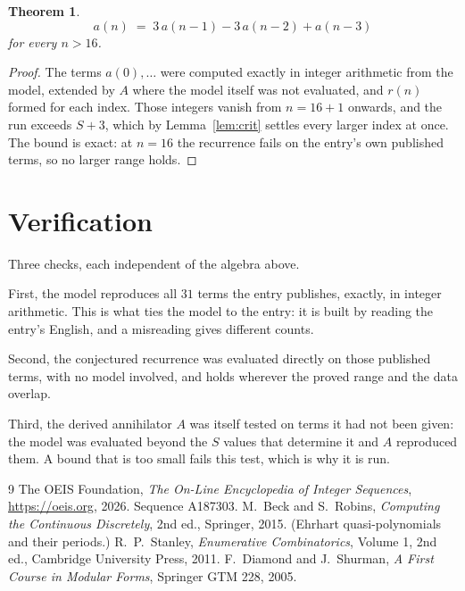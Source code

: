 \documentclass[11pt,a4paper]{article}
\theoremstyle{plain}
\newtheorem{theorem}{Theorem}
\theoremstyle{definition}
\begin{document}
\begin{theorem}
\[
a(n)\;=\;3\,a(n-1) - 3\,a(n-2) + a(n-3)
\]
for every $n>16$.
\end{theorem}

\begin{proof}
The terms $a(0),\dots$ were computed exactly in integer arithmetic from the model, extended by
$A$ where the model itself was not evaluated, and $r(n)$ formed for each index. Those integers
vanish from $n=16+1$ onwards, and the run exceeds $S+3$, which by
Lemma~\ref{lem:crit} settles every larger index at once. The bound is exact: at $n=16$ the recurrence fails on the entry's own published terms, so no larger range holds.
\end{proof}

\section{Verification}

Three checks, each independent of the algebra above.

First, the model reproduces all $31$ terms the entry publishes, exactly, in integer
arithmetic. This is what ties the model to the entry: it is built by reading the entry's
English, and a misreading gives different counts.

Second, the conjectured recurrence was evaluated directly on those published terms, with no
model involved, and holds wherever the proved range and the data overlap.

Third, the derived annihilator $A$ was itself tested on terms it had not been given: the model
was evaluated beyond the $S$ values that determine it and $A$ reproduced them. A bound that is
too small fails this test, which is why it is run.

\begin{thebibliography}{9}
 The OEIS Foundation, \emph{The On-Line Encyclopedia of Integer
Sequences}, \url{https://oeis.org}, 2026. Sequence A187303.
 M.~Beck and S.~Robins, \emph{Computing the Continuous Discretely},
2nd ed., Springer, 2015. (Ehrhart quasi-polynomials and their periods.)
 R.~P.~Stanley, \emph{Enumerative Combinatorics}, Volume 1, 2nd ed.,
Cambridge University Press, 2011.
 F.~Diamond and J.~Shurman, \emph{A First Course in Modular Forms},
Springer GTM 228, 2005.
\end{thebibliography}
\end{document}
